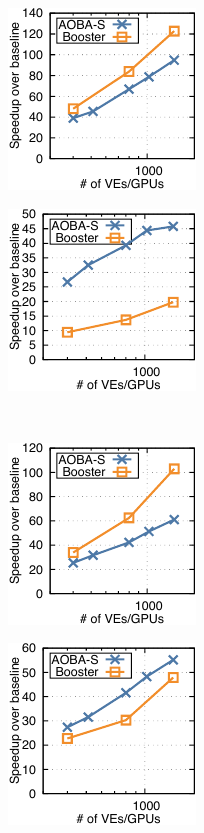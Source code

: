 ﻿\documentclass[submit,techrep,noauthor]{ipsj}
\begin{document}
\begin{figure}[tb]
  \begin{minipage}[b]{0.45\hsize}
    \centering
    \includegraphics{figs/spechpc_lbm_l.pdf}
    \label{fig:lbm-l}
  \end{minipage}
  \begin{minipage}[b]{0.45\hsize}
    \centering
    \includegraphics{figs/spechpc_tealeaf_l.pdf}
    \label{fig:tealeaf-l}
  \end{minipage} \\
  \begin{minipage}[b]{0.45\hsize}
    \centering
    \includegraphics{figs/spechpc_clvleaf_l.pdf}
    \label{fig:clvleaf-l}
  \end{minipage}
  \begin{minipage}[b]{0.45\hsize}
    \centering
    \includegraphics{figs/spechpc_pot3d_l.pdf}

\end{minipage}
\end{figure}
\end{document}
